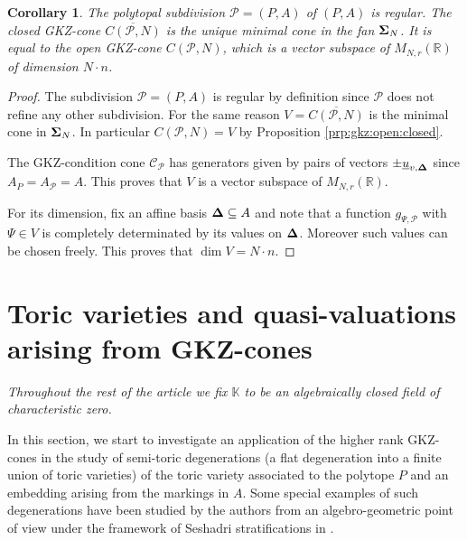 \documentclass[12pt, a4article]{amsart}   	%
\numberwithin{equation}{section}
\theoremstyle{plain}
\newtheorem{corollary}[theorem]{Corollary}
\theoremstyle{definition}
\newcommand{\R}{{\mathbb R}}
\newcommand{\bfSigma}{{\bf \Sigma}}
\newcommand{\bfDelta}{{\bf \Delta}}
\newcommand{\mcC}{{\mathcal C}}
\newcommand{\mcQ}{{\mathcal Q}}
\newcommand{\uu}{{\underline u}}
\newcommand{\MNaR}{M_{N,r}(\R)}
\begin{document}


\begin{corollary}\label{cor:minimal:gkz_cone}
The polytopal subdivision $\mathcal P=(P,A)$ of $(P,A)$ is regular. The closed GKZ-cone $\overline{C(\mathcal P,N)}$ is the unique minimal cone in the fan $\bfSigma_N$. It is equal to the open GKZ-cone $C(\mathcal P, N)$, which is a vector subspace of $\MNaR$ of dimension $N\cdot n$.
\end{corollary}

\begin{proof}
The subdivision $\mathcal P= (P,A)$ is regular by definition since $\mathcal P$ does not refine any other subdivision. For the same reason $V = \overline{C(\mathcal P,N)}$ is the minimal cone in $\bfSigma_N$. In particular $C(\mathcal P, N) = V$ by Proposition \ref{prp:gkz:open:closed}.

The GKZ-condition cone $\mcC_{\mathcal P}$ has generators given by pairs of vectors $\pm\uu_{v,\bfDelta}$ since $A_P=A_{\mathcal P} = A$. This proves that $V$ is a vector subspace of $\MNaR$.

For its dimension, fix an affine basis $\bfDelta\subseteq A$ and note that a function $g_{\Psi,\mathcal P}$ with $\Psi\in V$ is completely determinated by its values on $\bfDelta$. Moreover such values can be  chosen freely. This proves that $\dim V = N\cdot n$.
\end{proof}


\section{Toric varieties and quasi-valuations arising from GKZ-cones}\label{sec:quasi-valuations}

\emph{Throughout the rest of the article we fix $\mathbb{K}$ to be an algebraically closed field of characteristic zero.}


In this section, we start to investigate an application of the higher rank GKZ-cones in the study of semi-toric degenerations (a flat degeneration into a finite union of toric varieties) of the toric variety associated to the polytope $P$ and an embedding arising from the markings in $A$. Some special examples of such degenerations have been studied by the authors from an algebro-geometric point of view under the framework of Seshadri stratifications in \cite{CCFL}.
\end{document}
